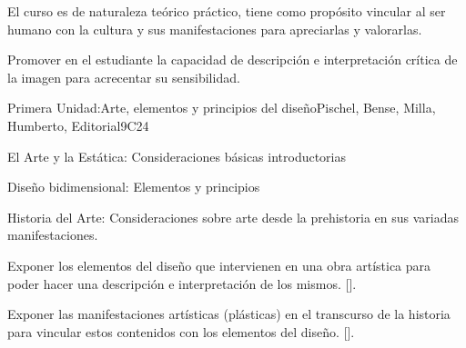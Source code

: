 \begin{syllabus}


\begin{justification}
El curso es de naturaleza teórico práctico, tiene como propósito vincular al ser humano con la cultura y sus manifestaciones para apreciarlas y valorarlas.
\end{justification}

\begin{goals}
\item Promover en el estudiante la capacidad de descripción e interpretación crítica de la imagen para acrecentar su sensibilidad.
\end{goals}

\begin{outcomes}
    \item {}
\end{outcomes}

\begin{competences}
    \item {}
\end{competences}

\begin{unit}{}{Primera Unidad:Arte, elementos y principios del diseño}{Pischel, Bense, Milla, Humberto, Editorial}{9}{C24}
\begin{topics}
	\item El Arte y la Estática: Consideraciones básicas introductorias
	\item Diseño bidimensional: Elementos y principios
	\item Historia del Arte: Consideraciones sobre arte desde la  prehistoria en sus variadas manifestaciones.
\end{topics}
\begin{learningoutcomes}
	\item Exponer los elementos del diseño que intervienen en una obra artística para poder hacer una descripción e interpretación de los mismos. [\Usage].
	\item Exponer las manifestaciones artísticas (plásticas) en el transcurso de la historia para vincular estos contenidos con los elementos del diseño. [\Usage].

\end{learningoutcomes}
\end{unit}


\end{syllabus}
